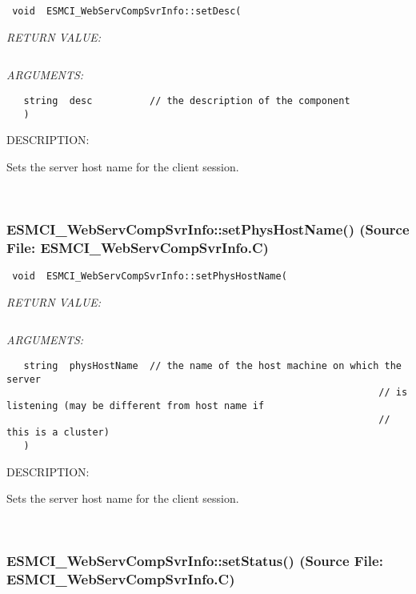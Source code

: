   
\begin{verbatim} void  ESMCI_WebServCompSvrInfo::setDesc(\end{verbatim}{\em RETURN VALUE:}
\begin{verbatim} \end{verbatim}{\em ARGUMENTS:}
\begin{verbatim}   string  desc          // the description of the component
   )\end{verbatim}
{\sf DESCRIPTION:\\ }


      Sets the server host name for the client session.
   
 
\mbox{}\hrulefill\
 
\subsubsection{ESMCI\_WebServCompSvrInfo::setPhysHostName() (Source File: ESMCI\_WebServCompSvrInfo.C)}


  
\begin{verbatim} void  ESMCI_WebServCompSvrInfo::setPhysHostName(\end{verbatim}{\em RETURN VALUE:}
\begin{verbatim} \end{verbatim}{\em ARGUMENTS:}
\begin{verbatim}   string  physHostName  // the name of the host machine on which the server
                                                                 // is listening (may be different from host name if
                                                                 // this is a cluster)
   )\end{verbatim}
{\sf DESCRIPTION:\\ }


      Sets the server host name for the client session.
   
 
\mbox{}\hrulefill\
 
\subsubsection{ESMCI\_WebServCompSvrInfo::setStatus() (Source File: ESMCI\_WebServCompSvrInfo.C)}


